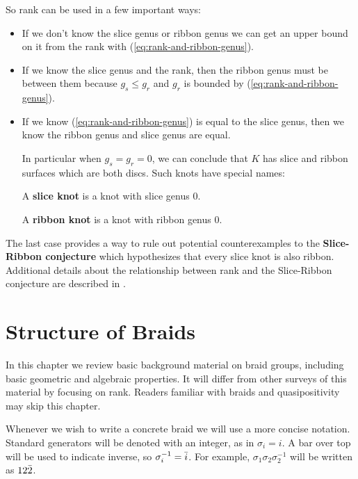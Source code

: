 \documentclass[12pt]{thesis}
\begin{document}
So rank can be used in a few important ways:
\begin{itemize}
    \item If we don't know the slice genus or ribbon genus
          we can get an upper bound on it from the rank
          with (\ref{eq:rank-and-ribbon-genus}).

    \item If we know the slice genus and the rank,
          then the ribbon genus must be between them
          because $g_{s} \leq g_{r}$ and $g_{r}$
          is bounded by (\ref{eq:rank-and-ribbon-genus}).

      \item If we know (\ref{eq:rank-and-ribbon-genus}) 
          is equal to the slice genus,
          then we know the ribbon genus and slice genus are equal.

          In particular when $g_{s} = g_{r} = 0$,
          we can conclude that $K$ has slice
          and ribbon surfaces which are both discs.
          Such knots have special names:

          \begin{definition}
              A \textbf{slice knot} is a knot with slice genus 0.
          \end{definition}
          \begin{definition}
              A \textbf{ribbon knot} is a knot with ribbon genus 0.
          \end{definition}
\end{itemize}

The last case provides a way
to rule out potential counterexamples to the \textbf{Slice-Ribbon conjecture}
which hypothesizes that every slice knot is also ribbon.
Additional details about the relationship between
rank and the Slice-Ribbon conjecture are described in \cite{on-braided-surfaces}.

\chapter{Structure of Braids}

\label{chap:structure}

In this chapter we review basic background material on braid groups,
including basic geometric and algebraic properties.
It will differ from other surveys of this material
by focusing on rank.
Readers familiar with braids and quasipositivity may skip this chapter.

Whenever we wish to write a concrete braid
we will use a more concise notation.
Standard generators will be denoted with an integer, as in $\sigma_{i} = i$.
A bar over top will be used to indicate inverse, so $\sigma_{i}^{-1} = \bar{i}$.
For example, $\sigma_{1}\sigma_{2}\sigma_{2}^{-1}$ will be written as
$12\bar{2}$.
\end{document}
